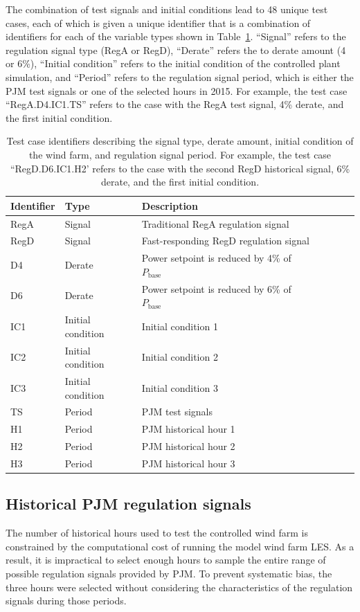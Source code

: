 The combination of test signals and initial conditions lead to 48 unique test cases, each of which is given a unique identifier that is a combination of identifiers for each of the variable types shown in Table~\ref{tab:cases}. ``Signal'' refers to the regulation signal type (RegA or RegD), ``Derate'' refers the to derate amount (4 or 6\%), ``Initial condition'' refers to the initial condition of the controlled plant simulation, and ``Period'' refers to the regulation signal period, which is either the PJM test signals or one of the selected hours in 2015. For example, the test case ``RegA.D4.IC1.TS'' refers to the case with the RegA test signal, 4\% derate, and the first initial condition. 
%
\begin{center}
\begin{table}[t]
\caption{\label{tab:cases} Test case identifiers describing the signal type, derate amount, initial condition of the wind farm, and regulation signal period. For example, the test case ``RegD.D6.IC1.H2' refers to the case with the second RegD historical signal, 6\% derate, and the first initial condition.}
\centering
\begin{tabular}{@{}*{7}{l}}
\hline
Identifier & Type & Description\\
\hline
RegA & Signal & Traditional RegA regulation signal\\
RegD & Signal & Fast-responding RegD regulation signal\\
D4 & Derate & Power setpoint is reduced by 4\% of $P_\text{base}$\\
D6 & Derate & Power setpoint is reduced by 6\% of $P_\text{base}$\\
IC1 & Initial condition & Initial condition 1\\
IC2 & Initial condition & Initial condition 2\\
IC3 & Initial condition & Initial condition 3\\
TS & Period & PJM test signals\\
H1 & Period & PJM historical hour 1\\
H2 & Period & PJM historical hour 2\\
H3 & Period & PJM historical hour 3\\
\hline
\end{tabular}
\end{table}
\end{center}

\subsection{Historical PJM regulation signals}
\label{subsec:rhc-pjm-hist}
The number of historical hours used to test the controlled wind farm is constrained by the computational cost of running the model wind farm LES. As a result, it is impractical to select enough hours to sample the entire range of possible regulation signals provided by PJM. To prevent systematic bias, the three hours were selected without considering the characteristics of the regulation signals during those periods. 


